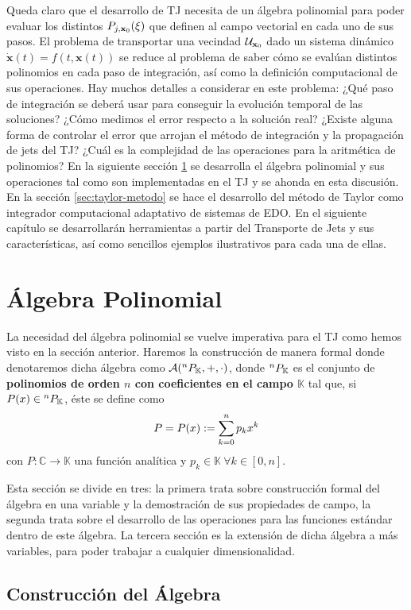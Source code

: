 Queda claro que el desarrollo de TJ necesita de un álgebra polinomial para poder evaluar los distintos $P_{j,\mathbf{x}_0}(\xi)$ que definen al campo vectorial en cada uno de sus pasos. El problema de transportar una vecindad $\mathcal{U}_{\mathbf{x}_0}$ dado un sistema dinámico $\dot{\mathbf{x}}(t) = f(t,\mathbf{x}(t))$ se reduce al problema de saber cómo se evalúan distintos polinomios en cada paso de integración, así como la definición computacional de sus operaciones. Hay muchos detalles a considerar en este problema: ¿Qué paso de integración se deberá usar para conseguir la evolución temporal de las soluciones? ¿Cómo medimos el error respecto a la solución real? ¿Existe alguna forma de controlar el error que arrojan el método de integración y la propagación de jets del TJ? ¿Cuál es la complejidad de las operaciones para la aritmética de polinomios? En la siguiente sección \ref{sec:alg_poli} se desarrolla el álgebra polinomial y sus operaciones tal como son implementadas en el TJ y se ahonda en esta discusión. En la sección \ref{sec:taylor-metodo} se hace el desarrollo del método de Taylor como integrador computacional adaptativo de sistemas de EDO. En el siguiente capítulo se desarrollarán herramientas a partir del Transporte de Jets y sus características, así como sencillos ejemplos ilustrativos para cada una de ellas.


\section{Álgebra Polinomial}
\label{sec:alg_poli}

La necesidad del álgebra polinomial se vuelve imperativa para el TJ como hemos visto en la sección anterior. Haremos la construcción de manera formal donde denotaremos  dicha álgebra como $\mathcal{A}(^{n}P_{\mathbb{K}},+,\cdot)$, donde ${^{n}P_{\mathbb{K}}}$ es el conjunto de \textbf{polinomios de orden $n$ con coeficientes en el campo $\mathbb{K}$} tal que, si  $P(x) \in {^{n}P_{\mathbb{K}}}$, éste se define como
$$P = P(x) := \sum_{k=0}^n p_k x^k $$
con $P: \mathbb{C} \to \mathbb{K}$ una función analítica y $p_k \in \mathbb{K} \  \forall k \in [0,n]$.

Esta sección se divide en tres: la primera trata sobre construcción formal del álgebra en una variable y la demostración de sus propiedades de campo, la segunda trata sobre el desarrollo de las operaciones para las funciones estándar dentro de este álgebra. La tercera sección es la extensión de dicha álgebra a más variables, para poder trabajar a cualquier dimensionalidad.
\subsection{Construcción del Álgebra}
\label{sec:alg_field}

